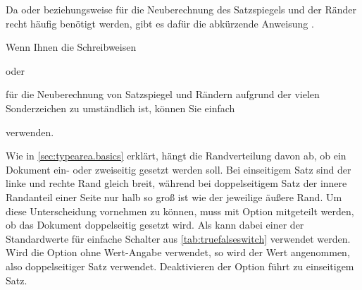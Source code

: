 Da %
%
 oder
%
 beziehungsweise
 für die Neuberechnung
des Satzspiegels und der Ränder recht häufig benötigt werden, gibt es dafür
die abkürzende Anweisung
.
\begin{Example}
  Wenn Ihnen die Schreibweisen
\begin{lstcode}
\end{lstcode}
  oder
\begin{lstcode}
\end{lstcode}
  für die Neuberechnung von Satzspiegel und Rändern aufgrund der vielen
  Sonderzeichen zu umständlich ist, können Sie einfach
\begin{lstcode}
  \recalctypearea
\end{lstcode}
  verwenden.
\end{Example}%
\EndIndexGroup


\begin{Declaration}
\end{Declaration}%
Wie in \autoref{sec:typearea.basics} erklärt, hängt
die Randverteilung davon ab, ob ein Dokument ein- oder zweiseitig gesetzt
werden soll. Bei einseitigem Satz sind der linke und rechte Rand gleich
breit, während bei doppelseitigem Satz der innere Randanteil einer Seite nur
halb so groß ist wie der jeweilige äußere Rand. Um diese Unterscheidung
vornehmen zu können, muss  mit Option 
mitgeteilt werden, ob das Dokument doppelseitig gesetzt wird. Als
 kann dabei einer der Standardwerte
für einfache Schalter aus \autoref{tab:truefalseswitch} verwendet werden. Wird
die Option ohne Wert-Angabe verwendet, so wird der Wert
 angenommen, also
doppelseitiger Satz verwendet. Deaktivieren der
Option führt zu einseitigem Satz.

